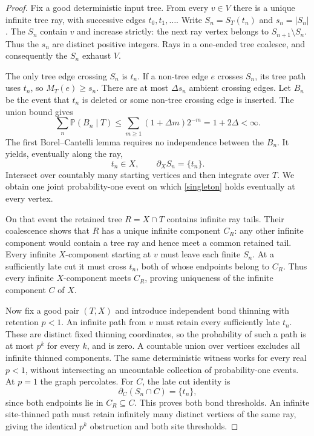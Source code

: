 \documentclass[11pt]{article}
\newcommand{\Pp}{\mathbb P}
\newcommand{\bd}{\partial}
\begin{document}
\begin{proof}
Fix a good deterministic input tree. From every $v\in V$ there is a unique infinite tree ray, with successive edges $t_0,t_1,\ldots$. Write $S_n=S_T(t_n)$ and $s_n=|S_n|$. The $S_n$ contain $v$ and increase strictly: the next ray vertex belongs to $S_{n+1}\setminus S_n$. Thus the $s_n$ are distinct positive integers. Rays in a one-ended tree coalesce, and consequently the $S_n$ exhaust $V$.

The only tree edge crossing $S_n$ is $t_n$. If a non-tree edge $e$ crosses $S_n$, its tree path uses $t_n$, so $M_T(e)\ge s_n$. There are at most $\Delta s_n$ ambient crossing edges. Let $B_n$ be the event that $t_n$ is deleted or some non-tree crossing edge is inserted. The union bound gives
\begin{equation}\label{sum}
 \sum_n\Pp(B_n\mid T)
 \le \sum_{m\ge1}(1+\Delta m)2^{-m}
 =1+2\Delta<\infty.
\end{equation}
The first Borel--Cantelli lemma requires no independence between the $B_n$. It yields, eventually along the ray,
\begin{equation}\label{singleton}
 t_n\in X,\qquad \bd_X S_n=\{t_n\}.
\end{equation}
Intersect over countably many starting vertices and then integrate over $T$. We obtain one joint probability-one event on which \eqref{singleton} holds eventually at every vertex.

On that event the retained tree $R=X\cap T$ contains infinite ray tails. Their coalescence shows that $R$ has a unique infinite component $C_R$: any other infinite component would contain a tree ray and hence meet a common retained tail. Every infinite $X$-component starting at $v$ must leave each finite $S_n$. At a sufficiently late cut it must cross $t_n$, both of whose endpoints belong to $C_R$. Thus every infinite $X$-component meets $C_R$, proving uniqueness of the infinite component $C$ of $X$.

Now fix a good pair $(T,X)$ and introduce independent bond thinning with retention $p<1$. An infinite path from $v$ must retain every sufficiently late $t_n$. These are distinct fixed thinning coordinates, so the probability of such a path is at most $p^k$ for every $k$, and is zero. A countable union over vertices excludes all infinite thinned components. The same deterministic witness works for every real $p<1$, without intersecting an uncountable collection of probability-one events. At $p=1$ the graph percolates. For $C$, the late cut identity is
\[
 \bd_C(S_n\cap C)=\{t_n\},
\]
since both endpoints lie in $C_R\subseteq C$. This proves both bond thresholds. An infinite site-thinned path must retain infinitely many distinct vertices of the same ray, giving the identical $p^k$ obstruction and both site thresholds.


\end{proof}
\end{document}
